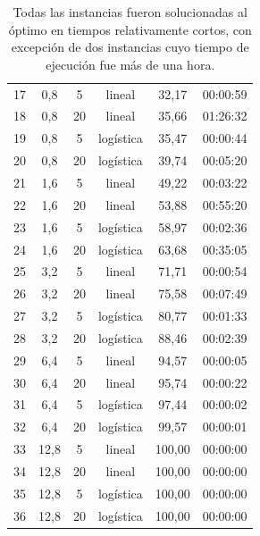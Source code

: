 \begin{table}
\begin{tabular}{cccccc}
      17 & 0,8 & 5 & lineal & 32,17 & 00:00:59 \\
      18 & 0,8 & 20 & lineal & 35,66 & 01:26:32 \\
      19 & 0,8 & 5 & logística & 35,47 & 00:00:44 \\
      20 & 0,8 & 20 & logística & 39,74 & 00:05:20 \\
      21 & 1,6 & 5 & lineal & 49,22 & 00:03:22 \\
      22 & 1,6 & 20 & lineal & 53,88 & 00:55:20 \\
      23 & 1,6 & 5 & logística & 58,97 & 00:02:36 \\
      24 & 1,6 & 20 & logística & 63,68 & 00:35:05 \\
      25 & 3,2 & 5 & lineal & 71,71 & 00:00:54 \\
      26 & 3,2 & 20 & lineal & 75,58 & 00:07:49 \\
      27 & 3,2 & 5 & logística & 80,77 & 00:01:33 \\
      28 & 3,2 & 20 & logística & 88,46 & 00:02:39 \\
      29 & 6,4 & 5 & lineal & 94,57 & 00:00:05 \\
      30 & 6,4 & 20 & lineal & 95,74 & 00:00:22 \\
      31 & 6,4 & 5 & logística & 97,44 & 00:00:02 \\
      32 & 6,4 & 20 & logística & 99,57 & 00:00:01 \\
      33 & 12,8 & 5 & lineal & 100,00 & 00:00:00 \\
      34 & 12,8 & 20 & lineal & 100,00 & 00:00:00 \\
      35 & 12,8 & 5 & logística & 100,00 & 00:00:00 \\
      36 & 12,8 & 20 & logística & 100,00 & 00:00:00 \\
      \bottomrule
  \end{tabular}
  \caption{Todas las instancias fueron solucionadas al óptimo en tiempos relativamente cortos, con excepción de dos instancias cuyo tiempo de ejecución fue más de una hora.} \label{table:sensibilityresults}
\end{table}

